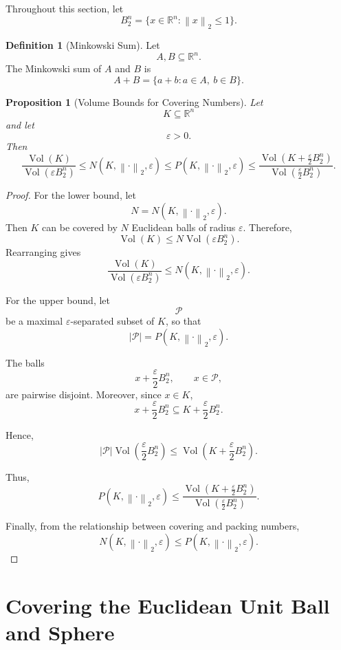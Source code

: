 \documentclass[12pt,oneside]{book}
\numberwithin{equation}{section}
\theoremstyle{definition}
\newtheorem{definition}{Definition}[section]
\theoremstyle{plain}
\newtheorem{proposition}{Proposition}[section]
\theoremstyle{remark}
\newcommand{\R}{\mathbb{R}}
\newcommand{\norm}[1]{\left\lVert #1 \right\rVert}
\begin{document}
Throughout this section, let
\[
B_2^n
=
\{x\in\R^n:\norm{x}_2\leq 1\}.
\]

\begin{definition}[Minkowski Sum]
Let
\[
A,B\subseteq \R^n.
\]
The Minkowski sum of $A$ and $B$ is
\[
A+B
=
\{a+b:a\in A,\ b\in B\}.
\]
\end{definition}

\begin{proposition}[Volume Bounds for Covering Numbers]
Let
\[
K\subseteq \R^n
\]
and let
\[
\varepsilon>0.
\]
Then
\[
\frac{\operatorname{Vol}(K)}
{\operatorname{Vol}(\varepsilon B_2^n)}
\leq
N(K,\norm{\cdot}_2,\varepsilon)
\leq
P(K,\norm{\cdot}_2,\varepsilon)
\leq
\frac{
\operatorname{Vol}\left(K+\frac{\varepsilon}{2}B_2^n\right)
}{
\operatorname{Vol}\left(\frac{\varepsilon}{2}B_2^n\right)
}.
\]
\end{proposition}

\begin{proof}
For the lower bound, let
\[
N=N(K,\norm{\cdot}_2,\varepsilon).
\]
Then $K$ can be covered by $N$ Euclidean balls of radius $\varepsilon$. Therefore,
\[
\operatorname{Vol}(K)
\leq
N\operatorname{Vol}(\varepsilon B_2^n).
\]
Rearranging gives
\[
\frac{\operatorname{Vol}(K)}
{\operatorname{Vol}(\varepsilon B_2^n)}
\leq
N(K,\norm{\cdot}_2,\varepsilon).
\]

For the upper bound, let
\[
\mathcal{P}
\]
be a maximal $\varepsilon$-separated subset of $K$, so that
\[
|\mathcal{P}|=P(K,\norm{\cdot}_2,\varepsilon).
\]

The balls
\[
x+\frac{\varepsilon}{2}B_2^n,
\qquad x\in\mathcal{P},
\]
are pairwise disjoint. Moreover, since $x\in K$,
\[
x+\frac{\varepsilon}{2}B_2^n
\subseteq
K+\frac{\varepsilon}{2}B_2^n.
\]

Hence,
\[
|\mathcal{P}|
\operatorname{Vol}\left(
\frac{\varepsilon}{2}B_2^n
\right)
\leq
\operatorname{Vol}\left(
K+\frac{\varepsilon}{2}B_2^n
\right).
\]

Thus,
\[
P(K,\norm{\cdot}_2,\varepsilon)
\leq
\frac{
\operatorname{Vol}\left(K+\frac{\varepsilon}{2}B_2^n\right)
}{
\operatorname{Vol}\left(\frac{\varepsilon}{2}B_2^n\right)
}.
\]

Finally, from the relationship between covering and packing numbers,
\[
N(K,\norm{\cdot}_2,\varepsilon)
\leq
P(K,\norm{\cdot}_2,\varepsilon).
\]
\end{proof}

\section{Covering the Euclidean Unit Ball and Sphere}
\end{document}
